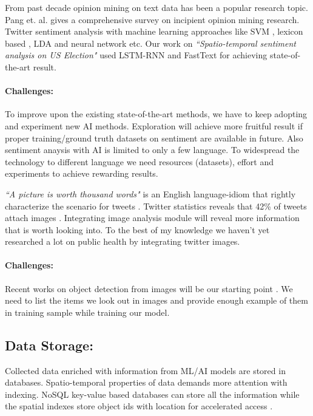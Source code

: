 From past decade opinion mining on text data has been a popular research topic. Pang et. al. \cite{pang2008opinion} gives a comprehensive survey on incipient opinion mining research. Twitter sentiment analysis with machine learning approaches like SVM \cite{joachims1998text}, lexicon based \cite{taboada2011lexicon}, LDA \cite{duric2012feature,kouloumpis2011twitter} and neural network \cite{dos2014deep,tang2015document} etc. Our work on {\em ``Spatio-temporal sentiment analysis on US Election"} used LSTM-RNN {\em } and FastText for achieving state-of-the-art result.

\vspace{-2mm}
\paragraph{Challenges:}
To improve upon the existing state-of-the-art methods, we have to keep adopting and experiment new AI methods. Exploration will achieve more fruitful result if proper training/ground truth datasets on sentiment are available in future. Also sentiment anaysis with AI is limited to only a few language. To widespread the technology to different language we need resources (datasets), effort and experiments to achieve rewarding results.


{\em ``A picture is worth thousand words"}  is an English language-idiom that rightly characterize the scenario for tweets \cite{advice1911syracuse}. Twitter statistics reveals that 42\% of tweets attach images \cite{tweets_images}. Integrating image analysis module will reveal more information that is worth looking into.
To the best of my knowledge we haven't yet researched a lot on public health by integrating twitter images.

\vspace{-2mm}
\paragraph{Challenges:}
Recent works on object detection from images will be our starting point \cite{girshick2014rich, mao2014deep}. We need to list the items we look out in images and provide enough example of them in training sample while training our model.


\subsection{Data Storage:}
Collected data enriched with information from ML/AI models are stored in databases. Spatio-temporal properties of data demands more attention with indexing. NoSQL key-value based databases can store all the information while the spatial indexes store object ids with location for accelerated access \cite{christensen2015storm}.

